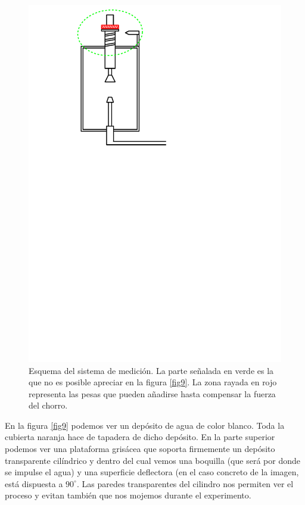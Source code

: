\documentclass[12pt,a4paper]{article}
\newcommand{\grad}{^{\circ}}
\begin{document}
\begin{figure}[H]
\begin{minipage}[b]{0.4\linewidth}
\includegraphics[width=\linewidth]{fotos/esquema_4}
\caption{Esquema del sistema de medición. La parte señalada en verde es la que no es posible apreciar en la figura \ref{fig9}. La zona rayada en rojo representa las pesas que pueden añadirse hasta compensar la fuerza del chorro.}
\label{fig10}
\end{minipage}
\end{figure}

En la figura \ref{fig9} podemos ver un depósito de agua de color blanco. Toda la cubierta naranja hace de tapadera de dicho depósito. En la parte superior podemos ver una plataforma grisácea que soporta firmemente un depósito transparente cilíndrico y dentro del cual vemos una boquilla (que será por donde se impulse el agua) y una superficie deflectora (en el caso concreto de la imagen, está dispuesta a $90\grad$. Las paredes transparentes del cilindro nos permiten ver el proceso y evitan también que nos mojemos durante el experimento.
\end{document}
